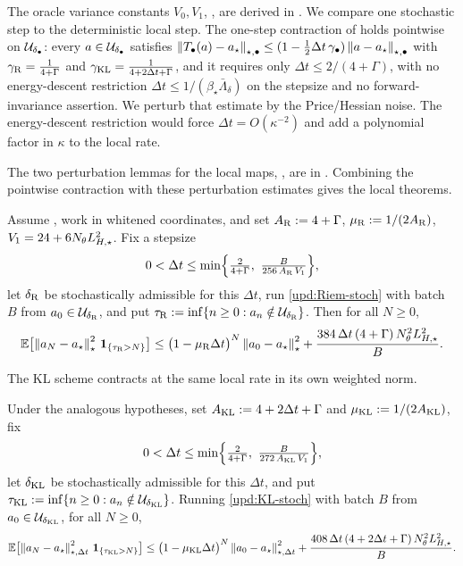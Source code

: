 The oracle variance constants $V_0,V_1$, , are derived in .
We compare one stochastic step to the deterministic
local step. The one-step contraction of  holds pointwise on
$\mathcal{U}_{\delta_\bullet}$: every $a\in\mathcal{U}_{\delta_\bullet}$ satisfies
$\left\lVert T_\bullet(a)-a_\star\right\rVert_{\star,\bullet}\leq(1-\tfrac12\Delta t\,\gamma_\bullet)\left\lVert a-a_\star\right\rVert_{\star,\bullet}$
with $\gamma_{\mathrm{R}}=\tfrac1{4+\Gamma}$ and $\gamma_{\mathrm{KL}}=\tfrac1{4+2\Delta t+\Gamma}$, and it requires
only $\Delta t\leq2/(4+\Gamma)$, with no energy-descent restriction $\Delta t\leq1/(\beta_\star\bar\Lambda_\delta)$
on the stepsize and no forward-invariance assertion. We perturb that estimate by the Price/Hessian
noise. The energy-descent restriction would force $\Delta t=O(\kappa^{-2})$ and add a polynomial
factor in $\kappa$ to the local rate.

The two perturbation lemmas for the local maps, , are in
. Combining the pointwise contraction with these
perturbation estimates gives the local theorems.

\begin{theorem}
\label{thm:stoch-loc-Riem}
Assume , work in whitened coordinates, and set
$A_{\mathrm{R}}:=4+\Gamma$, $\mu_{\mathrm{R}}:=1/(2A_{\mathrm{R}})$, $V_1=24+6N_\theta L_{H,\star}^2$. Fix a stepsize
\[
    0<\Delta t\leq\min\Bigl\{\tfrac2{4+\Gamma},\ \tfrac{B}{256\,A_{\Riem}\,V_1}\Bigr\},
\]
let $\delta_{\mathrm{R}}$ be stochastically admissible for this $\Delta t$, run \eqref{upd:Riem-stoch} with
batch $B$ from $a_0\in\mathcal{U}_{\delta_{\mathrm{R}}}$, and put
$\tau_{\mathrm{R}}:=\inf\{n\geq0:a_n\notin\mathcal{U}_{\delta_{\mathrm{R}}}\}$. Then for all $N\geq0$,
\[
    \mathbb{E}\bigl[\left\lVert a_N-a_\star\right\rVert_\star^2\,\mathbf 1_{\{\tau_{\mathrm{R}}>N\}}\bigr]
    \leq\bigl(1-\mu_{\mathrm{R}}\Delta t\bigr)^N\left\lVert a_0-a_\star\right\rVert_\star^2
    +\frac{384\,\Delta t\,(4+\Gamma)\,N_\theta^2L_{H,\star}^2}{B}.
\]
\end{theorem}

The KL scheme contracts at the same local rate in its own weighted norm.

\begin{theorem}
\label{thm:stoch-loc-KL}
Under the analogous hypotheses, set $A_{\mathrm{KL}}:=4+2\Delta t+\Gamma$ and $\mu_{\mathrm{KL}}:=1/(2A_{\mathrm{KL}})$, fix
\[
    0<\Delta t\leq\min\Bigl\{\tfrac2{4+\Gamma},\ \tfrac{B}{272\,A_{\KL}\,V_1}\Bigr\},
\]
let $\delta_{\mathrm{KL}}$ be stochastically admissible for this $\Delta t$, and put
$\tau_{\mathrm{KL}}:=\inf\{n\geq0:a_n\notin\mathcal{U}_{\delta_{\mathrm{KL}}}\}$. Running \eqref{upd:KL-stoch} with batch $B$
from $a_0\in\mathcal{U}_{\delta_{\mathrm{KL}}}$, for all $N\geq0$,
\[
    \mathbb{E}\bigl[\left\lVert a_N-a_\star\right\rVert_{\star,\Delta t}^2\,\mathbf 1_{\{\tau_{\mathrm{KL}}>N\}}\bigr]
    \leq\bigl(1-\mu_{\mathrm{KL}}\Delta t\bigr)^N\left\lVert a_0-a_\star\right\rVert_{\star,\Delta t}^2
    +\frac{408\,\Delta t\,(4+2\Delta t+\Gamma)\,N_\theta^2L_{H,\star}^2}{B}.
\]
\end{theorem}

